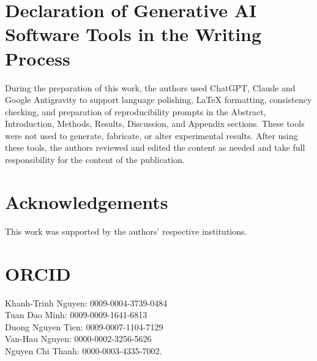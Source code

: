 \documentclass[12pt,a4paper]{jedm}
\begin{document}
\appendix


\section*{Declaration of Generative AI Software Tools in the Writing Process}
During the preparation of this work, the authors used ChatGPT, Claude and Google Antigravity to support language polishing, LaTeX formatting, consistency checking, and preparation of reproducibility prompts in the Abstract, Introduction, Methods, Results, Discussion, and Appendix sections. These tools were not used to generate, fabricate, or alter experimental results. After using these tools, the authors reviewed and edited the content as needed and take full responsibility for the content of the publication.

\section*{Acknowledgements}
This work was supported by the authors' respective institutions.

\section*{ORCID}
\noindent Khanh-Trinh Nguyen: 0009-0004-3739-0484\\
\noindent Tuan Dao Minh: 0009-0009-1641-6813\\
\noindent Duong Nguyen Tien: 0009-0007-1104-7129\\
\noindent Van-Hau Nguyen: 0000-0002-3256-5626\\
\noindent Nguyen Chi Thanh: 0000-0003-4335-7002.



% 
\end{document}
